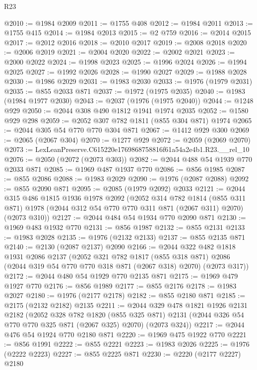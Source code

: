 \begin{lexlean}{R23}
\begin{coremodule}
@2010 := @1984 @2009
@2011 := @1755 @408
@2012 := @1984 @2011
@2013 := @1755 @415
@2014 := @1984 @2013
@2015 := @2 @759
@2016 := @2014 @2015
@2017 := @2012 @2016
@2018 := @2010 @2017
@2019 := @2008 @2018
@2020 := @2006 @2019
@2021 := @2004 @2020
@2022 := @2002 @2021
@2023 := @2000 @2022
@2024 := @1998 @2023
@2025 := @1996 @2024
@2026 := @1994 @2025
@2027 := @1992 @2026
@2028 := @1990 @2027
@2029 := @1988 @2028
@2030 := @1986 @2029
@2031 := @1983 @2030
@2033 := @1976 (@1979 @2031)
@2035 := @855 @2033 @871
@2037 := @1972 (@1975 @2035)
@2040 := @1983 (@1984 @1977 @2030)
@2043 := @2037 (@1976 (@1975 @2040))
@2044 := @1248 @929
@2050 := @2044 @308 @490 @1812 @1941 @1974 @2035
@2052 := @1580 @929 @298
@2059 := @2052 @307 @782 @1811 (@855 @304 @871) @1974
@2065 := @2044 @305 @54 @770 @770 @304 @871
@2067 := @1412 @929 @300
@2069 := @2065 (@2067 @304)
@2070 := @1277 @929
@2072 := @2059 (@2069 @2070)
@2073 := LexLeanPreserve.C615220e1769868758816f61a54a2e4b1.R23.__rel_10
@2076 := @2050 (@2072 (@2073 @303))
@2082 := @2044 @488 @54 @1939 @770 @2033 @871
@2085 := @1969 @487 @1937 @770
@2086 := @856 @1985
@2087 := @855 @2086
@2088 := @1983 @2029
@2090 := @1976 (@2087 @2088)
@2092 := @855 @2090 @871
@2095 := @2085 (@1979 @2092) @2033
@2121 := @2044
    @315
    @486
    @1815
    @1936
    @1978
    @2092
    (@2052
      @314
      @782
      @1814
      (@855 @311 @871)
      @1978
      (@2044 @312 @54 @770 @770 @311 @871 (@2067 @311) @2070)
      (@2073 @310))
@2127 := @2044 @484 @54 @1934 @770 @2090 @871
@2130 := @1969 @483 @1932 @770
@2131 := @856 @1987
@2132 := @855 @2131
@2133 := @1983 @2028
@2135 := @1976 (@2132 @2133)
@2137 := @855 @2135 @871
@2140 := @2130 (@2087 @2137) @2090
@2166 := @2044
    @322
    @482
    @1818
    @1931
    @2086
    @2137
    (@2052
      @321
      @782
      @1817
      (@855 @318 @871)
      @2086
      (@2044 @319 @54 @770 @770 @318 @871 (@2067 @318) @2070)
      (@2073 @317))
@2172 := @2044 @480 @54 @1929 @770 @2135 @871
@2175 := @1969 @479 @1927 @770
@2176 := @856 @1989
@2177 := @855 @2176
@2178 := @1983 @2027
@2180 := @1976 (@2177 @2178)
@2182 := @855 @2180 @871
@2185 := @2175 (@2132 @2182) @2135
@2211 := @2044
    @329
    @478
    @1821
    @1926
    @2131
    @2182
    (@2052
      @328
      @782
      @1820
      (@855 @325 @871)
      @2131
      (@2044 @326 @54 @770 @770 @325 @871 (@2067 @325) @2070)
      (@2073 @324))
@2217 := @2044 @476 @54 @1924 @770 @2180 @871
@2220 := @1969 @475 @1922 @770
@2221 := @856 @1991
@2222 := @855 @2221
@2223 := @1983 @2026
@2225 := @1976 (@2222 @2223)
@2227 := @855 @2225 @871
@2230 := @2220 (@2177 @2227) @2180

\end{coremodule}
\end{lexlean}

